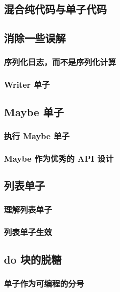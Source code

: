 \documentclass[./main.tex]{subfiles}
\begin{document}
\subsection*{混合纯代码与单子代码}

\subsection*{消除一些误解}

\subsubsection*{序列化日志，而不是序列化计算}

\subsubsection*{Writer 单子}

\subsection*{Maybe 单子}

\subsubsection*{执行 Maybe 单子}

\subsubsection*{Maybe 作为优秀的 API 设计}

\subsection*{列表单子}

\subsubsection*{理解列表单子}

\subsubsection*{列表单子生效}

\subsection*{do 块的脱糖}

\subsubsection*{单子作为可编程的分号}
\end{document}
